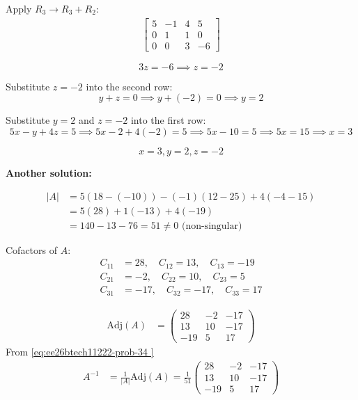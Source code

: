 \begin{enumerate}[label=\thesubsection.\arabic*, ref=\thesubsection.\theenumi]
Apply $R_3 \rightarrow R_3 + R_2$:
\begin{align}
	\left[ \begin{array}{ccc|c}
		5 & -1 & 4 & 5 \\
		0 & 1 & 1 & 0 \\
		0 & 0 & 3 & -6
	\end{array} \right]
\end{align}


$$3z = -6 \implies z = -2$$


Substitute $z = -2$ into the second row:
$$
y + z = 0 \implies y + (-2) = 0 \implies y = 2
$$

Substitute $y = 2$ and $z = -2$ into the first row:
$$
5x - y + 4z = 5 \implies 5x - 2 + 4(-2) = 5 \implies 5x - 10 = 5 \implies 5x = 15 \implies x = 3
$$



$$x = 3 , y = 2 , z = -2$$

\textbf{Another solution:}

\begin{align*}
|A| &= 5(18 - (-10)) - (-1)(12 - 25) + 4(-4 - 15) \\
&= 5(28) + 1(-13) + 4(-19) \\
&= 140 - 13 - 76 = 51 \neq 0 \text{ (non-singular)}
\end{align*}

Cofactors of $A$:
\begin{align*}
C_{11} &= 28, \quad C_{12} = 13, \quad C_{13} = -19 \\
C_{21} &= -2, \quad C_{22} = 10, \quad C_{23} = 5 \\
C_{31} &= -17, \quad C_{32} = -17, \quad C_{33} = 17
\end{align*}

\begin{align}
\text{Adj}(A) &= \begin{pmatrix} 28 & -2 & -17 \\ 13 & 10 & -17 \\ -19 & 5 & 17 \end{pmatrix} 
\end{align}
From \eqref{eq:ee26btech11222-prob-34 }
\begin{align}
A^{-1} &= \frac{1}{|A|} \text{Adj}(A) = \frac{1}{51} \begin{pmatrix} 28 & -2 & -17 \\ 13 & 10 & -17 \\ -19 & 5 & 17 \end{pmatrix}
\end{align}


\end{enumerate}

